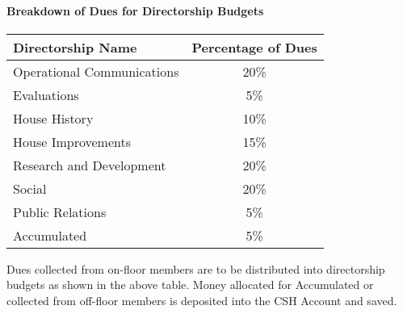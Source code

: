\documentclass{article}
\newcommand{\asubsubsection}[1]{\paragraph{#1} \label{#1}}
\begin{document}
\asubsubsection{Breakdown of Dues for Directorship Budgets}
\begin{center}
\begin{tabular}[c]{|l c|}
\hline
Directorship Name & Percentage of Dues \\
\hline
\hline
Operational Communications & 20\% \\
\hline
Evaluations & 5\% \\
\hline
House History & 10\% \\
\hline
House Improvements & 15\% \\
\hline
Research and Development & 20\% \\
\hline
Social & 20\% \\
\hline
Public Relations & 5\% \\
\hline
Accumulated & 5\% \\
\hline
\end{tabular}
\end{center}


Dues collected from on-floor members are to be distributed into directorship budgets as shown in the above table.
Money allocated for Accumulated or collected from off-floor members is deposited into the CSH Account and saved.
\end{document}
